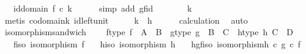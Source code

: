 \begin{isabellebody}
\ {\isachardoublequoteopen}{\isachardot}{\kern0pt}{\isachardot}{\kern0pt}{\isachardot}{\kern0pt}\ {\isacharequal}{\kern0pt}\ id{\isacharparenleft}{\kern0pt}domain\ f{\isacharparenright}{\kern0pt}\ {\isasymcirc}\isactrlsub c\ k{\isachardoublequoteclose}\isanewline
\ \ \ \ \isamarkupfalse%
\ {\isacharparenleft}{\kern0pt}simp\ add{\isacharcolon}{\kern0pt}\ gf{\isacharunderscore}{\kern0pt}id{\isacharparenright}{\kern0pt}\isanewline
\ \ \isamarkupfalse%
\ \isamarkupfalse%
\ {\isachardoublequoteopen}{\isachardot}{\kern0pt}{\isachardot}{\kern0pt}{\isachardot}{\kern0pt}\ {\isacharequal}{\kern0pt}\ k{\isachardoublequoteclose}\isanewline
\ \ \ \ \isamarkupfalse%
\ {\isacharparenleft}{\kern0pt}metis\ codomain{\isacharunderscore}{\kern0pt}k\ id{\isacharunderscore}{\kern0pt}left{\isacharunderscore}{\kern0pt}unit{\isacharparenright}{\kern0pt}\isanewline
\ \ \isamarkupfalse%
\ \isamarkupfalse%
\ {\isachardoublequoteopen}k\ {\isacharequal}{\kern0pt}\ h{\isachardoublequoteclose}\isanewline
\ \ \ \ \isamarkupfalse%
\ calculation\ \isamarkupfalse%
\ auto\isanewline
{}\isamarkupfalse%
%
\endisatagproof
{\isafoldproof}%
%
\isadelimproof
\isanewline
%
\endisadelimproof
\isanewline
{}\isamarkupfalse%
\ isomorphism{\isacharunderscore}{\kern0pt}sandwich{\isacharcolon}{\kern0pt}\ \isanewline
\ \ \ f{\isacharunderscore}{\kern0pt}type{\isacharcolon}{\kern0pt}\ {\isachardoublequoteopen}f\ {\isacharcolon}{\kern0pt}\ A\ {\isasymrightarrow}\ B{\isachardoublequoteclose}\ \ g{\isacharunderscore}{\kern0pt}type{\isacharcolon}{\kern0pt}\ {\isachardoublequoteopen}g\ {\isacharcolon}{\kern0pt}\ B\ {\isasymrightarrow}\ C{\isachardoublequoteclose}\ \ h{\isacharunderscore}{\kern0pt}type{\isacharcolon}{\kern0pt}\ {\isachardoublequoteopen}h{\isacharcolon}{\kern0pt}\ C\ {\isasymrightarrow}\ D{\isachardoublequoteclose}\isanewline
\ \ \ f{\isacharunderscore}{\kern0pt}iso{\isacharcolon}{\kern0pt}\ {\isachardoublequoteopen}isomorphism\ f{\isachardoublequoteclose}\isanewline
\ \ \ h{\isacharunderscore}{\kern0pt}iso{\isacharcolon}{\kern0pt}\ {\isachardoublequoteopen}isomorphism\ h{\isachardoublequoteclose}\isanewline
\ \ \ hgf{\isacharunderscore}{\kern0pt}iso{\isacharcolon}{\kern0pt}\ {\isachardoublequoteopen}isomorphism{\isacharparenleft}{\kern0pt}h\ {\isasymcirc}\isactrlsub c\ g\ {\isasymcirc}\isactrlsub c\ f{\isacharparenright}{\kern0pt}{\isachardoublequoteclose}\isanewline

\end{isabellebody}
